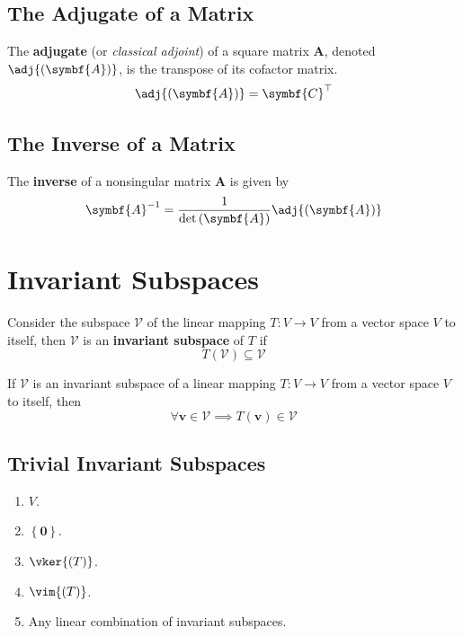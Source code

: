 \documentclass{article}
\begin{document}
\subsection{The Adjugate of a Matrix}
\begin{definition}
    The \textbf{adjugate} (or \textit{classical adjoint}) of a square
    matrix \(\symbf{A}\), denoted
    \(\adj{\left( \symbf{A} \right)}\), is the transpose of its cofactor
    matrix.
    \begin{equation*}
        \adj{\left( \symbf{A} \right)} = \symbf{C}^\top
    \end{equation*}
\end{definition}
\subsection{The Inverse of a Matrix}
\begin{theorem}
    The \textbf{inverse} of a nonsingular matrix \(\symbf{A}\) is
    given by
    \begin{equation*}
        \symbf{A}^{-1}=\frac{1}{\det{\left( \symbf{A} \right)}} \adj{\left( \symbf{A} \right)}
    \end{equation*}
\end{theorem}
\section{Invariant Subspaces}
\begin{definition}
    Consider the subspace \(\mathcal{V}\) of the linear mapping
    \(T:V\rightarrow V\) from a vector space \(V\) to itself, then
    \(\mathcal{V}\) is an \textbf{invariant subspace} of \(T\) if
    \begin{equation*}
        T\left(\mathcal{V}\right)\subseteq \mathcal{V}
    \end{equation*}
\end{definition}
\begin{theorem}
    If \(\mathcal{V}\) is an invariant subspace of a linear mapping
    \(T: V \rightarrow V\) from a vector space \(V\) to itself, then
    \begin{equation*}
        \forall \symbf{v}\in \mathcal{V}\implies T\left(\symbf{v}\right)\in \mathcal{V}
    \end{equation*}
\end{theorem}
\subsection{Trivial Invariant Subspaces}
\begin{enumerate}
    \item \(V\).
    \item \(\left\{ \symbf{0} \right\}\).
    \item \(\vker{\left( T \right)}\).
    \item \(\vim{\left( T \right)}\).
    \item Any linear combination of invariant subspaces.
\end{enumerate}
\end{document}
